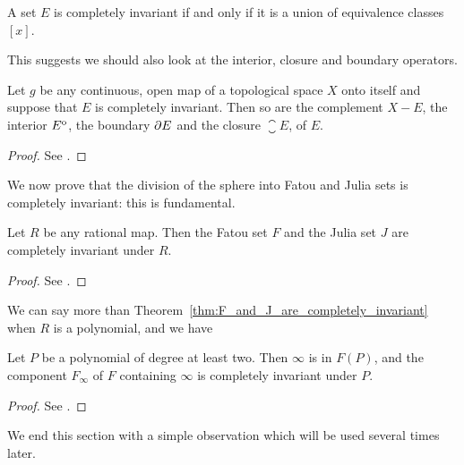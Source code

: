 \begin{corollary}
    A set $E$ is completely invariant if and only if it is a union of
    equivalence classes $[x]$.
\end{corollary}

This suggests we should also look at the interior, closure and boundary
operators.

\begin{theorem}
    \label{thm:complete_invariance_is_preserved_under_complement_interior_and_boundary}
    Let $g$ be any continuous, open map of a topological space $X$ onto itself
    and suppose that $E$ is completely invariant. Then so are the complement $X
    - E$, the interior ${E}^{\mathrm{o}}$, the boundary $\partial {E}$ and the
    closure $\closure{E}$, of $E$.
\end{theorem}
\begin{proof}
    See \cite[53]{Beardon1991}.
\end{proof}

We now prove that the division of the sphere into Fatou and Julia sets is
completely invariant: this is fundamental.

\begin{theorem}
    \label{thm:F_and_J_are_completely_invariant}
    Let $R$ be any rational map. Then the Fatou set $F$ and the Julia set $J$
    are completely invariant under $R$.
\end{theorem}
\begin{proof}
    See \cite[54]{Beardon1991}.
\end{proof}

We can say more than Theorem~\ref{thm:F_and_J_are_completely_invariant} when $R$
is a polynomial, and we have

\begin{theorem}
    \label{thm:F_infty_is_completely_invariant_for_polynomials}
    Let $P$ be a polynomial of degree at least two. Then $\infty$ is in $F(P)$,
    and the component $F_\infty$ of $F$ containing $\infty$ is completely
    invariant under $P$.
\end{theorem}
\begin{proof}
    See \cite[54]{Beardon1991}.
\end{proof}

We end this section with a simple observation which will be used several times
later.

